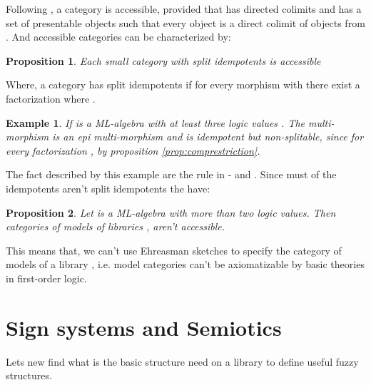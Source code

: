 \documentclass[oribibl]{llncs}
\newtheorem{prop}{Proposition}
\newtheorem{exam}{Example}
\begin{document}
Following \cite{Adamek94}, a category is accessible, provided that has directed colimits and has a set  of presentable objects such that every object is a direct colimit of objects from . And accessible categories can be characterized by:

\begin{prop}\cite{Adamek94}
Each small category with split idempotents is accessible
\end{prop}
Where, a category has split idempotents if for every morphism  with  there exist a factorization  where .

\begin{exam}
If  is a ML-algebra with at least three logic values . The multi-morphism 
is an epi multi-morphism and is idempotent but non-splitable, since for every factorization ,  by proposition \ref{prop:comprestriction}.
\end{exam}

The fact described by this example are the rule in - and . Since must of the idempotents aren't split idempotents the have:

\begin{prop}
Let  is a ML-algebra with more than two logic values. Then categories of models of libraries , aren't accessible.
\end{prop}

This means that, we can't use Ehreasman sketches to specify the category of models of a library \cite{Adamek94}, i.e. model categories can't be axiomatizable by basic theories in first-order logic.

\section{Sign systems and Semiotics}\label{Sings Semiotics}

Lets new find what is the basic structure need on a library to define useful fuzzy structures.
\end{document}

